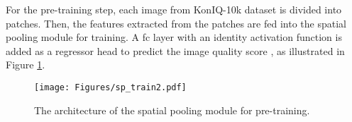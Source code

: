 \documentclass[journal]{IEEEtran}
\begin{document}
For the pre-training step, each image from KonIQ-10k dataset is divided into  patches. Then, the features extracted from the patches  are fed into the spatial pooling module for training. A \ac{fc} layer with an identity activation function is added as a regressor head to predict the image quality score , as illustrated in Figure \ref{sp_train}.
\begin{figure}[t!]
\centering
 \texttt{[image: Figures/sp\_train2.pdf]}
\caption{The architecture of the spatial pooling module for pre-training.}
\label{sp_train}
\end{figure}
\begin{table}[!]
\caption{Performance of the ablation study for the spatial pooling module on the KonIQ-10k dataset. Bold entries indicate the top three performing methods, while the best method is underlined.}
\end{table}
\end{document}
